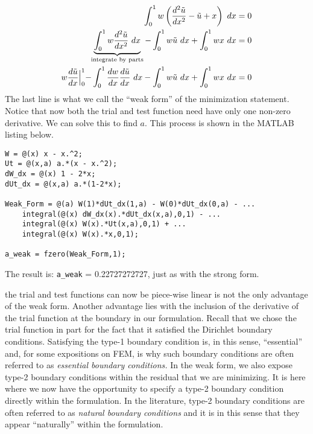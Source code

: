 \begin{align*}
\int_{0}^{1} w \left(\frac{d^2 \tilde{u}}{dx^2}-\tilde{u}+x \right) \ dx &= 0 \\
\underbrace{\int_{0}^{1} w \frac{d^2 \tilde{u}}{dx^2} \ dx}_{\text{integrate by parts}} - \int_{0}^{1} w \tilde{u} \ dx + \int_{0}^{1}wx \ dx &= 0 \\
w \frac{d\tilde{u}}{dx}\Bigl|_0^1 - \int_{0}^{1}\frac{dw}{dx}\frac{d\tilde{u}}{dx}\ dx - \int_{0}^{1} w \tilde{u} \ dx + \int_{0}^{1}wx \ dx &= 0 \\
\end{align*}
The last line is what we call the ``weak form'' of the minimization statement.  Notice that now both the trial and test function need have only one non-zero derivative.  We can solve this to find $a$.  This process is shown in the MATLAB listing below.

\begin{lstlisting}[style=myMatlab,name=lec33n-weak-form]
%% Weak Form
W = @(x) x - x.^2;
Ut = @(x,a) a.*(x - x.^2);
dW_dx = @(x) 1 - 2*x;
dUt_dx = @(x,a) a.*(1-2*x);

Weak_Form = @(a) W(1)*dUt_dx(1,a) - W(0)*dUt_dx(0,a) - ... 
    integral(@(x) dW_dx(x).*dUt_dx(x,a),0,1) - ...
    integral(@(x) W(x).*Ut(x,a),0,1) + ...
    integral(@(x) W(x).*x,0,1);

a_weak = fzero(Weak_Form,1);
\end{lstlisting}
The result is: \lstinline[style=myMatlab]{a_weak} = 0.22727272727, just as with the strong form.

 the trial and test functions can now be piece-wise linear is not the only advantage of the weak form.  Another advantage lies with the inclusion of the derivative of the trial function at the boundary in our formulation. Recall that we chose the trial function in part for the fact that it satisfied the Dirichlet boundary conditions.  Satisfying the type-1 boundary condition is, in this sense, ``essential'' and, for some expositions on FEM, is why such boundary conditions are often referred to as \emph{essential boundary conditions.}  In the weak form, we also expose type-2 boundary conditions within the residual that we are minimizing.  It is here where we now have the opportunity to specify a type-2 boundary condition directly within the formulation.  In the literature, type-2 boundary conditions are often referred to as \emph{natural boundary conditions} and it is in this sense that they appear ``naturally'' within the formulation. 
 


